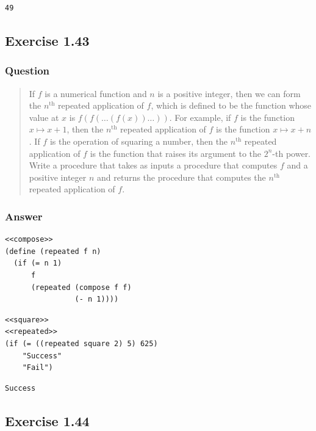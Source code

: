 \documentclass[final,fleqn,titlepage,twoside]{article}
\begin{document}
\begin{verbatim}
49
\end{verbatim}

\subsection{Exercise 1.43}
\label{sec:orga4408f4}
\subsubsection{Question}
\label{sec:orgc6bb088}
\begin{quote}
If \(f\) is a numerical function
and \(n\) is a positive integer, then we can form the \(n^{\mathrm{th}}\) repeated
application of \(f\), which is defined to be the function whose value at \(x\)
is \(f(f(\dots (f(x))\dots ))\).  For example, if \(f\) is the
function \(x \mapsto x + 1\), then the \(n^{\mathrm{th}}\) repeated application of \(f\) is
the function \(x \mapsto x + n\).  If \(f\) is the operation of squaring a
number, then the \(n^{\mathrm{th}}\) repeated application of \(f\) is the function that
raises its argument to the \(2^n\)-th power.  Write a procedure that takes as
inputs a procedure that computes \(f\) and a positive integer \(n\) and returns
the procedure that computes the \(n^{\mathrm{th}}\) repeated application of \(f\).
\end{quote}

\subsubsection{Answer}
\label{sec:org827d481}
\begin{verbatim}
<<compose>>
(define (repeated f n)
  (if (= n 1)
      f
      (repeated (compose f f)
                (- n 1))))
\end{verbatim}

\begin{verbatim}
<<square>>
<<repeated>>
(if (= ((repeated square 2) 5) 625)
    "Success"
    "Fail")
\end{verbatim}

\begin{verbatim}
Success
\end{verbatim}

\subsection{Exercise 1.44}
\label{sec:org967b0ae}
\end{document}
